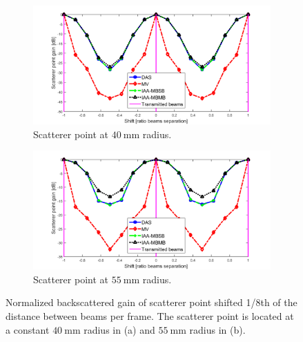 \begin{figure}[ht]
    \centering
    \begin{subfigure}[t]{\linewidth}
        \includegraphics[width=\linewidth]{./images/results/1/loss_vs_shift_40mm.png}
        \caption{Scatterer point at $40~$mm radius.}
    \end{subfigure}
    \quad
    \begin{subfigure}[t]{\linewidth}
        \includegraphics[width=\linewidth]{./images/results/1/loss_vs_shift_55mm.png}
        \caption{Scatterer point at $55~$mm radius.}
    \end{subfigure}
	\caption[Normalized backscattered gain of scatterer point shifted 1/8th of the distance between beams per frame.]{Normalized backscattered gain of scatterer point shifted 1/8th of the distance between beams per frame. The scatterer point is located at a constant $40~$mm radius in (a) and $55~$mm radius in (b).}
	\label{fig:loss_vs_shift}
\end{figure}


